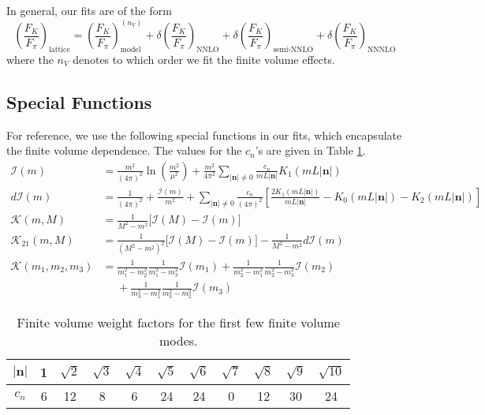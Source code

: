 \documentclass[prd,tightenlines,preprintnumbers,showpacs,superscriptaddress,notitlepage,eqsecnum,floatfix,notitlepage]{revtex4-1}
\begin{document}
In general, our fits are of the form
\begin{equation}
\left(\frac{F_K}{F_\pi}\right)_\text{lattice} = \left(\frac{F_K}{F_\pi}\right)_\text{model}^{(n_V)} +
\delta\left(\frac{F_K}{F_\pi}\right)_\text{NNLO} +
\delta\left(\frac{F_K}{F_\pi}\right)_\text{semi-NNLO} +
\delta\left(\frac{F_K}{F_\pi}\right)_\text{NNNLO}
\end{equation}
where the $n_V$ denotes to which order we fit the finite volume effects.
\subsection{Special Functions}
For reference, we use the following special functions in our fits, which encapsulate the finite volume dependence. The values for the $c_n$'s are given in Table \ref{tab:cN_weights}.
\begin{align}
\mathcal{I}(m) &= \frac{m^2}{(4\pi)^2} \ln \left( \frac{m^2}{\mu^2} \right)
+ \frac{m^2}{4\pi^2} \sum_{|\mathbf{n}|\neq0} \frac{c_n}{mL|\mathbf{n}|} K_1(mL|\mathbf{n}|) \label{eqn:I(m)} \\
d\mathcal{I}(m) &=
\frac{1}{(4\pi)^2} + \frac{\mathcal{I}(m)}{m^2}
+\sum_{|\mathbf{n}|\neq0} \frac{c_n}{(4\pi)^2} \left[
\frac{2K_1(mL|\mathbf{n}|)}{mL|\mathbf{n}|}
-K_0(mL|\mathbf{n}|)
-K_2(mL|\mathbf{n}|)\right] \\
\mathcal{K}(m,M) &= \frac{1}{M^2 - m^2} \Big[ \mathcal{I}(M) - \mathcal{I}(m) \Big] \\
\mathcal{K}_{21}(m,M) &=
\frac{1}{(M^2 - m^2)^2} \Big[ \mathcal{I}(M) - \mathcal{I}(m) \Big]
-\frac{1}{M^2 - m^2} d\mathcal{I}(m) \\
\mathcal{K}(m_1,m_2,m_3) &= \frac{1}{m_1^2 - m_2^2}\frac{1}{m_1^2-m_3^2} \mathcal{I}(m_1)
+\frac{1}{m_2^2 - m_1^2} \frac{1}{m_2^2 - m_3^2} \mathcal{I}(m_2)
\nonumber\\&\phantom{=}
+\frac{1}{m_3^2 - m_1^2} \frac{1}{m_3^2 - m_2^2} \mathcal{I}(m_3)
\end{align}

\begin{table}
	\begin{ruledtabular}
		\begin{tabular}{c|cccccccccc}
			$|\mathbf{n}|$& 1 & $\sqrt{2}$& $\sqrt{3}$& $\sqrt{4}$& $\sqrt{5}$& $\sqrt{6}$& $\sqrt{7}$& $\sqrt{8}$& $\sqrt{9}$& $\sqrt{10}$\\
			\hline
			$c_n$& 6&12& 8& 6& 24& 24& 0& 12& 30& 24
		\end{tabular}
	\end{ruledtabular}
	\caption{\label{tab:cN_weights}
		Finite volume weight factors for the first few finite volume modes.
	}
\end{table}
\end{document}
